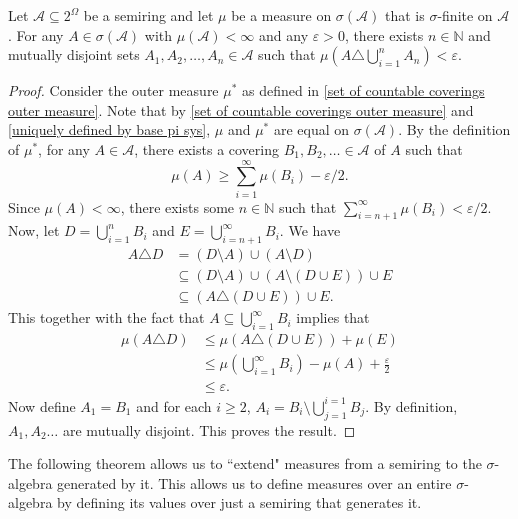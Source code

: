 \begin{theorem}
\label{Approximation Thm for Measures}
    Let $\mathcal{A}\subseteq 2^\Omega$ be a semiring and let $\mu$ be a measure on $\sigma(\mathcal{A})$ that is $\sigma$-finite on $\mathcal{A}$.
    For any $A\in\sigma(\mathcal{A})$ with $\mu(\mathcal{A})<\infty$ and any $\varepsilon>0$, there exists $n\in\mathbb{N}$ and mutually disjoint sets $A_1,A_2,\ldots,A_n\in \mathcal{A}$ such that $\mu\left(A\triangle\bigcup_{i=1}^n A_n\right)<\varepsilon$.
\end{theorem}
\begin{proof}
    Consider the outer measure $\mu^*$ as defined in \cref{set of countable coverings outer measure}. Note that by \cref{set of countable coverings outer measure} and \cref{uniquely defined by base pi sys}, $\mu$ and $\mu^*$ are equal on $\sigma(\mathcal{A})$. By the definition of $\mu^*$, for any $A\in\mathcal{A}$, there exists a covering $B_1,B_2,\ldots\in\mathcal{A}$ of $A$ such that
    $$\mu(A)\geq\sum_{i=1}^\infty\mu(B_i) - \varepsilon/2.$$
    Since $\mu(A)<\infty$, there exists some $n\in\mathbb{N}$ such that $\sum_{i=n+1}^\infty \mu(B_i) < \varepsilon/2$. Now, let $D=\bigcup_{i=1}^n B_i$ and $E=\bigcup_{i=n+1}^\infty B_i$. We have
    \begin{align*}
        A\triangle D &= (D\setminus A)\cup(A\setminus D) \\
        &\subseteq (D\setminus A)\cup (A\setminus (D\cup E))\cup E \\
        &\subseteq (A\triangle (D\cup E))\cup E.
    \end{align*}
    This together with the fact that $A\subseteq\bigcup_{i=1}^\infty B_i$ implies that
    \begin{align*}
        \mu(A\triangle D) &\leq \mu(A\triangle (D\cup E)) + \mu(E) \\
        &\leq  \mu\left(\bigcup_{i=1}^\infty B_i\right) - \mu(A) + \frac{\varepsilon}{2} \\
        &\leq \varepsilon.
    \end{align*}
    Now define $A_1=B_1$ and for each $i\geq 2$, $A_i = B_i\setminus \bigcup_{j=1}^{i=1} B_j$. By definition, $A_1,A_2\ldots$ are mutually disjoint. This proves the result.
    
\end{proof}

The following theorem allows us to ``extend" measures from a semiring to the $\sigma$-algebra generated by it. This allows us to define measures over an entire $\sigma$-algebra by defining its values over just a semiring that generates it.

